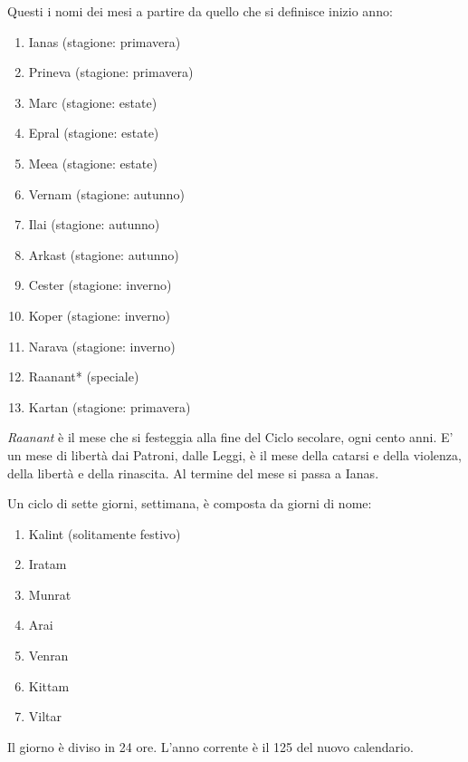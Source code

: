 \documentclass[landscape,10pt,a4paper]{article}
\begin{document}
\begin{multicols}{3}
\begin{dmbox}[title=Modificatori d'Attacco e Difesa - pagina \pageref{modificatoriattaccodifesaparticolari}]
\end{dmbox}

\begin{dmbox}[title=Il calendario \pageref{il-calendario}]

Questi i nomi dei mesi a partire da quello che si definisce inizio anno:

\begin{enumerate}
	\item Ianas (stagione: primavera)
	\item Prineva (stagione: primavera)
	\item Marc (stagione: estate)
	\item Epral (stagione: estate)
	\item Meea (stagione: estate)
	\item Vernam (stagione: autunno)
	\item Ilai (stagione: autunno)
	\item Arkast (stagione: autunno)
	\item Cester (stagione: inverno)
	\item Koper (stagione: inverno)
	\item Narava (stagione: inverno)
	\item Raanant* (speciale)
	\item Kartan (stagione: primavera)
\end{enumerate}


\medskip

\emph{Raanant} è il mese che si festeggia alla fine del Ciclo secolare, ogni cento anni. E' un mese di libertà dai Patroni, dalle Leggi, è il mese della catarsi e della violenza, della libertà e della rinascita. Al termine del mese si passa a Ianas.

\medskip

Un ciclo di sette giorni, settimana, è composta da giorni di nome:

\medskip


\begin{enumerate}
	\item Kalint (solitamente festivo)
	\item Iratam
	\item Munrat
	\item Arai
	\item Venran
	\item Kittam
	\item Viltar
\end{enumerate}


\medskip

Il giorno è diviso in 24 ore. L'anno corrente è il 125 del nuovo calendario.

\end{dmbox}

\end{multicols}
\end{document}
